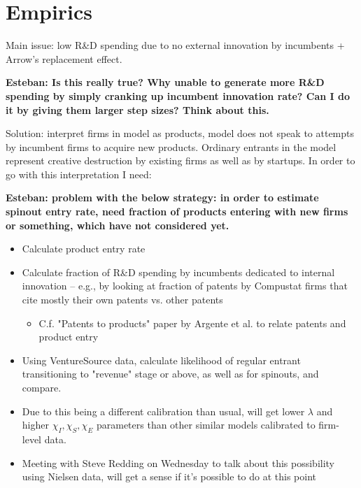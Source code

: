 \documentclass[12pt,english]{article}
\theoremstyle{remark}
\begin{document}
\section{Empirics}

Main issue: low R\&D spending due to no external innovation by incumbents + Arrow's replacement effect.

\textbf{Esteban: Is this really true? Why unable to generate more R\&D spending by simply cranking up incumbent innovation rate? Can I do it by giving them larger step sizes? Think about this.}

Solution: interpret firms in model as products, model does not speak to attempts by incumbent firms to acquire new products. Ordinary entrants in the model represent creative destruction by existing firms as well as by startups. In order to go with this interpretation I need:

\textbf{Esteban: problem with the below strategy: in order to estimate spinout entry rate, need fraction of products entering with new firms or something, which have not considered yet.}

\begin{itemize}
	\item Calculate product entry rate
	\item Calculate fraction of R\&D spending by incumbents dedicated to internal innovation -- e.g., by looking at fraction of patents by Compustat firms that cite mostly their own patents vs. other patents
	\begin{itemize}
		\item C.f. "Patents to products" paper by Argente et al. to relate patents and product entry
	\end{itemize}
	\item Using VentureSource data, calculate likelihood of regular entrant transitioning to "revenue" stage or above, as well as for spinouts, and compare.
	\item Due to this being a different calibration than usual, will get lower $\lambda$ and higher $\chi_I,\chi_S,\chi_E$ parameters than other similar models calibrated to firm-level data.
	\item Meeting with Steve Redding on Wednesday to talk about this possibility using Nielsen data, will get a sense if it's possible to do at this point
\end{itemize}
\end{document}
